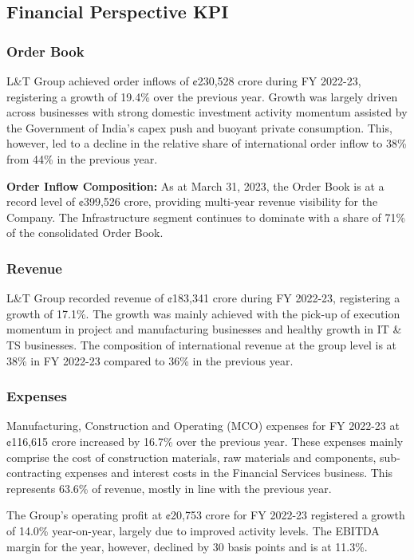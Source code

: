\subsection{Financial Perspective KPI}

\subsubsection{Order Book}

L\&T Group achieved order inflows of ¢230,528 crore during FY 2022-23, registering a growth of 19.4\% over the previous year. Growth was largely driven across businesses with strong domestic investment activity momentum assisted by the Government of India’s capex push and buoyant private consumption. This, however, led to a decline in the relative share of international order inflow to 38\% from 44\% in the previous year. 

\textbf{Order Inflow Composition:} As at March 31, 2023, the Order Book is at a record level of ¢399,526 crore, providing multi-year revenue visibility for the Company. The Infrastructure segment continues to dominate with a share of 71\% of the consolidated Order Book.

\subsubsection{Revenue}

L\&T Group recorded revenue of ¢183,341 crore during FY 2022-23, registering a growth of 17.1\%. The growth was mainly achieved with the pick-up of execution momentum in project and manufacturing businesses and healthy growth in IT \& TS businesses. The composition of international revenue at the group level is at 38\% in FY 2022-23 compared to 36\% in the previous year.

\subsubsection{Expenses}

Manufacturing, Construction and Operating (MCO) expenses for FY 2022-23 at ¢116,615 crore increased by 16.7\% over the previous year. These expenses mainly comprise the cost of construction materials, raw materials and components, sub-contracting expenses and interest costs in the Financial Services business. This represents 63.6\% of revenue, mostly in line with the previous year.

The Group’s operating profit at ¢20,753 crore for FY 2022-23 registered a growth of 14.0\% year-on-year, largely due to improved activity levels. The EBITDA margin for the year, however, declined by 30 basis points and is at 11.3\%.


